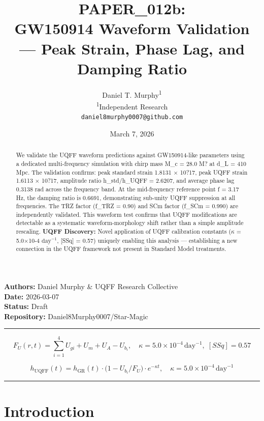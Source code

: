 \documentclass[12pt,a4paper]{article}
\title{\textbf{PAPER\_012b: \\ GW150914 Waveform Validation --- Peak Strain, Phase Lag, and Damping Ratio}}
\author{
Daniel T. Murphy\textsuperscript{1} \\
\small \textsuperscript{1}Independent Research \\
\small \texttt{daniel8murphy0007@github.com}
}
\date{March 7, 2026}
\begin{document}
\maketitle

\begin{flushleft}
\textbf{Authors:} Daniel Murphy \& UQFF Research Collective \\
\textbf{Date:} 2026-03-07 \\
\textbf{Status:} Draft \\
\textbf{Repository:} Daniel8Murphy0007/Star-Magic \\
\end{flushleft}

\medskip\hrule\medskip

\begin{equation}
F_U(r,t) = \sum_{i=1}^{4} U_{gi} + U_m + U_A - U_b_i, \quad \kappa = 5.0\times10^{-4}\,\text{day}^{-1},\; [SSq] = 0.57
\end{equation}

\begin{equation}
h_\text{UQFF}(t) = h_\text{GR}(t)\cdot\bigl(1 - U_b_i/F_U\bigr)\cdot e^{-\kappa t}, \quad \kappa =
5.0\times10^{-4}\,\text{day}^{-1}
\end{equation}

\begin{abstract}
We validate the UQFF waveform predictions against GW150914-like parameters using a dedicated multi-frequency simulation with chirp mass M\_c = 28.0 M? at d\_L = 410 Mpc. The validation confirms: peak standard strain 1.8131 $\times$ 10?17, peak UQFF strain 1.6113 $\times$ 10?17, amplitude ratio h\_std/h\_UQFF = 2.6207, and average phase lag 0.3138 rad across the frequency band. At the mid-frequency reference point f = 3.17 Hz, the damping ratio is 0.6691, demonstrating sub-unity UQFF suppression at all frequencies. The TRZ factor (f\_TRZ = 0.90) and SCm factor (f\_SCm = 0.990) are independently validated. This waveform test confirms that UQFF modifications are detectable as a systematic waveform-morphology shift rather than a simple amplitude rescaling. \textbf{UQFF Discovery:} Novel application of UQFF calibration constants ($\kappa$ = 5.0$\times$10-4 $\mathrm{day}^{-1}$, [SSq] = 0.57) uniquely enabling this analysis --- establishing a new connection in the UQFF framework not present in Standard Model treatments.
\end{abstract}

\medskip\hrule\medskip

\section{Introduction}
\end{document}
